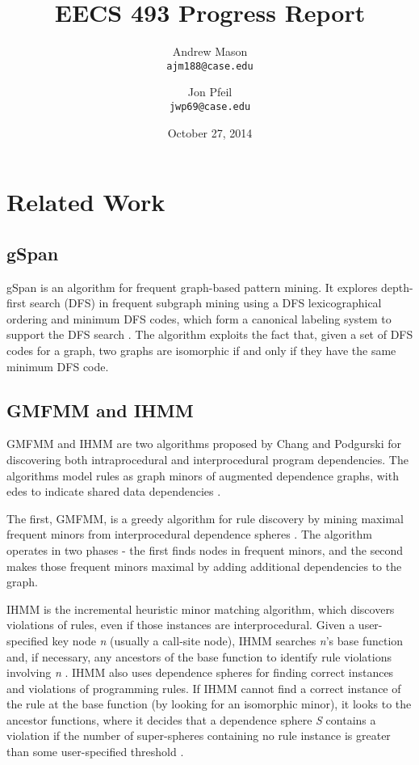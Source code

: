 \documentclass[12pt]{article}
\title{EECS 493 Progress Report}
\author{
    Andrew Mason\\
    \texttt{ajm188@case.edu}
    \and
    Jon Pfeil\\
    \texttt{jwp69@case.edu}
}
\date{October 27, 2014}
\begin{document}
\maketitle
\tableofcontents
\pagebreak

\section{Related Work}
\subsection{gSpan}
gSpan is an algorithm for frequent graph-based pattern mining. It explores depth-first  search (DFS) in frequent subgraph mining using a DFS lexicographical ordering and minimum DFS codes, which form a canonical labeling system to support the DFS search \cite{Yan:2002:GGS:844380.844811}. The algorithm exploits the fact that, given a set of DFS codes for a graph, two graphs are isomorphic if and only if they have the same minimum DFS code.

\subsection{GMFMM and IHMM}
GMFMM and IHMM are two algorithms proposed by Chang and Podgurski for discovering both intraprocedural and interprocedural program dependencies. The algorithms model rules as graph minors of augmented dependence graphs, with edes to indicate shared data dependencies \cite{DBLP:journals/smr/ChangP12}.

The first, GMFMM, is a greedy algorithm for rule discovery by mining maximal frequent minors from interprocedural dependence spheres \cite{DBLP:journals/smr/ChangP12}. The algorithm operates in two phases - the first finds nodes in frequent minors, and the second makes those frequent minors maximal by adding additional dependencies to the graph.

IHMM is the incremental heuristic minor matching algorithm, which discovers violations of rules, even if those instances are interprocedural. Given a user-specified key node \textit{n} (usually a call-site node), IHMM searches \textit{n}'s base function and, if necessary, any ancestors of the base function to identify rule violations involving \textit{n} \cite{DBLP:journals/smr/ChangP12}. IHMM also uses dependence spheres for finding correct instances and violations of programming rules. If IHMM cannot find a correct instance of the rule at the base function (by looking for an isomorphic minor), it looks to the ancestor functions, where it decides that a dependence sphere \textit{S} contains a violation if the number of super-spheres containing no rule instance is greater than some user-specified threshold \cite{DBLP:journals/smr/ChangP12}.
\end{document}

